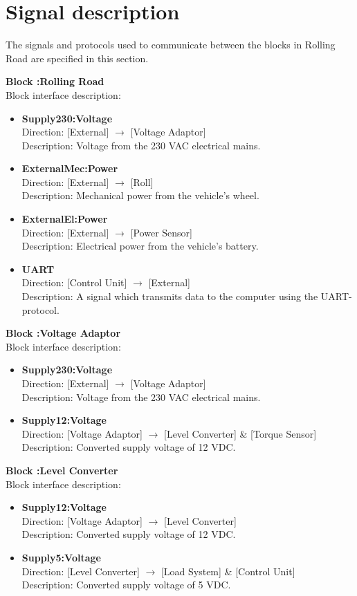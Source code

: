  \section{Signal description}
The signals and protocols used to communicate between the blocks in Rolling Road are specified in this section.

\textbf{Block :Rolling Road}\\
Block interface description:
\begin{itemize}
	\item \textbf{Supply230:Voltage}\\
	Direction: [External] $\rightarrow$ [Voltage Adaptor]\\
	Description: Voltage from the 230 VAC electrical mains.
	\item \textbf{ExternalMec:Power}\\
	Direction: [External] $\rightarrow$ [Roll]\\
	Description: Mechanical power from the vehicle's wheel.
	\item \textbf{ExternalEl:Power}\\
	Direction: [External] $\rightarrow$ [Power Sensor]\\
	Description: Electrical power from the vehicle's battery.
	\item \textbf{UART}\\
	Direction: [Control Unit] $\rightarrow$ [External]\\
	Description: A signal which transmits data to the computer using the UART-protocol.
\end{itemize}
	
\textbf{Block :Voltage Adaptor}\\
Block interface description:
\begin{itemize}
	\item \textbf{Supply230:Voltage}\\
	Direction: [External] $\rightarrow$ [Voltage Adaptor]\\
	Description: Voltage from the 230 VAC electrical mains.
	\item \textbf{Supply12:Voltage}\\
	Direction: [Voltage Adaptor] $\rightarrow$ [Level Converter] \& [Torque Sensor]\\
	Description: Converted supply voltage of 12 VDC.
\end{itemize}
		
\textbf{Block :Level Converter}\\
Block interface description:
\begin{itemize}
	\item \textbf{Supply12:Voltage}\\
	Direction: [Voltage Adaptor] $\rightarrow$ [Level Converter]\\
	Description: Converted supply voltage of 12 VDC.
	\item \textbf{Supply5:Voltage}\\
	Direction: [Level Converter] $\rightarrow$ [Load System] \& [Control Unit]\\
	Description: Converted supply voltage of 5 VDC.
\end{itemize}
			
